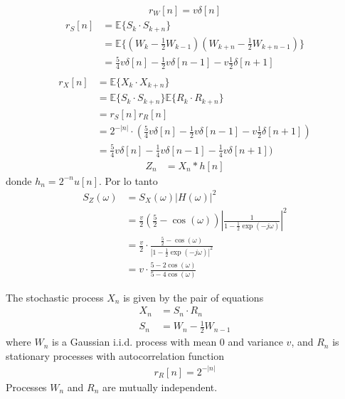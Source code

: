 \begin{solution}
\begin{parts}
\parte
\begin{align*}
r_W[n] = v \delta[n]
\end{align*}
\parte
\begin{align*}
r_S[n] &= \mathbb{E}\{S_k \cdot S_{k+n}\} \\
       &= \mathbb{E}\{(W_k - \frac12 W_{k-1})(W_{k+n} - \frac12 W_{k+n-1})\} \\
       &= \frac{5}{4} v \delta[n] - \frac12 v \delta[n-1] - v \frac12 \delta[n+1] \\
\end{align*}
\parte
\begin{align*}
r_X[n] &= \mathbb{E}\{X_k \cdot X_{k+n}\} \\
       &= \mathbb{E}\{S_k \cdot S_{k+n}\} \mathbb{E}\{R_k \cdot R_{k+n}\} \\
       &= r_S[n] r_R[n] \\
       &= 2^{-|n|} \cdot
          \left(\frac{5}{4} v \delta[n] - \frac12 v \delta[n-1] - v \frac12 \delta[n+1]\right) \\
       &= \frac{5}{4} v \delta[n] - \frac14 v \delta[n-1] - \frac14 v \delta[n+1])
\end{align*}
\parte
\begin{align*}
Z_n &= X_n \ast h[n]
\end{align*}
donde $h_n = 2^{-n} u[n]$. Por lo tanto
\begin{align*}
S_Z(\omega) 
     &= S_X(\omega) |H(\omega)|^2 \\
     &= \frac{v}{2} \left(\frac52 - \cos(\omega)\right) \left|\frac{1}{1-\frac12 \exp(-j\omega)}\right|^2   \\
     &= \frac{v}{2} \cdot \frac{\frac52 - \cos(\omega)}{ \left|1-\frac12 \exp(-j\omega)\right|^2}  \\
     &= v \cdot \frac{5 - 2 \cos(\omega)}{5 - 4\cos(\omega)}
\end{align*}
\end{parts}
\end{solution}

\else

The stochastic process  $X_n$ is given by the  pair of equations
\begin{align*}
X_n &= S_n \cdot R_n   \\
S_n &= W_n - \frac12 W_{n-1}
\end{align*}
where $W_n$ is a Gaussian i.i.d. process with mean $0$ and variance $v$, and $R_n$ is stationary processes with autocorrelation function
\begin{align*}
r_R[n] = 2^{-|n|} 
\end{align*}
Processes $W_n$ and $R_n$ are mutually independent.

